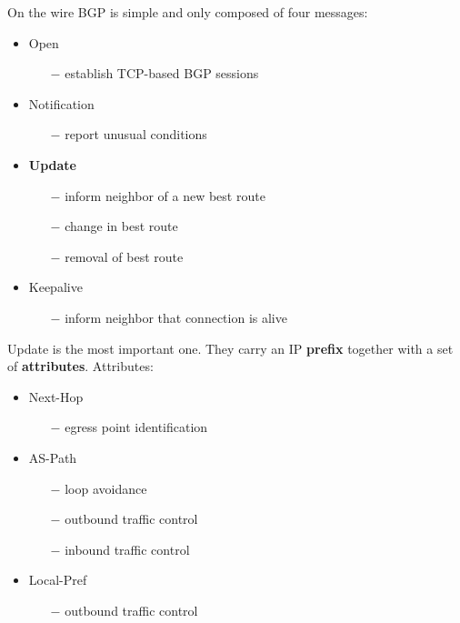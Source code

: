 \documentclass[a4paper, fontsize=8pt, landscape, DIV=1]{scrartcl}
\begin{document}
\begin{multicols*}{4}
\begin{itemize}[noitemsep]
\begin{itemize}
 			\end{itemize}
 		\end{itemize}        
		On the wire BGP is simple and only composed of four messages: 
		\begin{itemize}[noitemsep]
			\item Open 
			\begin{itemize}
				\item[$-$] establish TCP-based BGP sessions
			\end{itemize} 
			\item Notification 
			\begin{itemize}
				\item[$-$] report unusual conditions 
			\end{itemize}
			\item \textbf{Update} 
			\begin{itemize}
				\item[$-$] inform neighbor of a new best route
				\item[$-$] change in best route
				\item[$-$] removal of best route
			\end{itemize} 
			\item Keepalive
			\begin{itemize}
				\item[$-$] inform neighbor that connection is alive
			\end{itemize}
		\end{itemize}
		Update is the most important one. They carry an IP \textbf{prefix} together with a set of \textbf{attributes}. Attributes: 
		\begin{itemize}[noitemsep]
			\item Next-Hop
			\begin{itemize}
				\item[$-$] egress point identification
			\end{itemize}
			\item AS-Path
			\begin{itemize}
				\item[$-$] loop avoidance
				\item[$-$] outbound traffic control
				\item[$-$] inbound traffic control
			\end{itemize}
			\item Local-Pref
			\begin{itemize}
				\item[$-$] outbound traffic control
			\end{itemize}

\end{itemize}
\end{multicols*}
\end{document}
